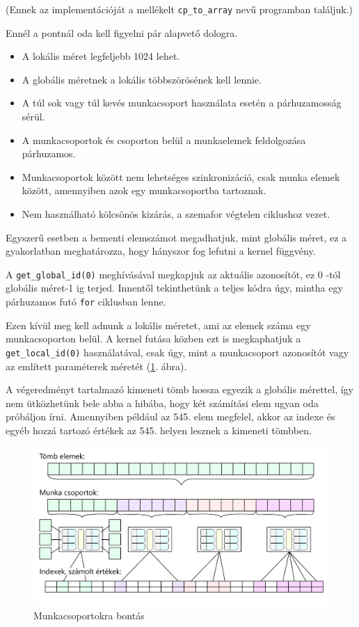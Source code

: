\noindent (Ennek az implementációját a mellékelt \texttt{cp\_to\_array} nevű programban találjuk.)

Ennél a pontnál oda kell figyelni pár alapvető dologra.
\begin{itemize}
\item A lokális méret legfeljebb 1024 lehet.
\item A globális méretnek a lokális többszörösének kell lennie.
\item A túl sok vagy túl kevés munkacsoport használata esetén a párhuzamosság sérül.
\item A munkacsoportok és csoporton belül a munkaelemek feldolgozása párhuzamos.
\item Munkacsoportok között nem lehetséges szinkronizáció, csak munka elemek között, amennyiben azok egy munkacsoportba tartoznak.
\item Nem használható kölcsönös kizárás, a szemafor végtelen ciklushoz vezet.
\end{itemize}


Egyszerű esetben a bementi elemszámot megadhatjuk, mint globális méret, ez a gyakorlatban meghatározza, hogy hányszor fog lefutni a kernel függvény.

A \texttt{get\_global\_id(0)} meghívásával megkapjuk az aktuális azonosítót, ez 0 -tól globális méret-1 ig terjed. Innentől tekinthetünk a teljes kódra úgy, mintha egy párhuzamos futó \texttt{for} ciklusban lenne.

Ezen kívül meg kell adnunk a lokális méretet, ami az elemek száma egy munkacsoporton belül. A kernel futása közben ezt is megkaphatjuk a \texttt{get\_local\_id(0)} használatával, csak úgy, mint a munkacsoport azonosítót vagy az említett paraméterek méretét (\ref{fig:workgroups_black}. ábra).

A végeredményt tartalmazó kimeneti tömb hossza egyezik a globális mérettel, így nem ütközhetünk bele abba a hibába, hogy két számítási elem ugyan oda próbáljon írni. Amennyiben például az 545. elem megfelel, akkor az indexe és egyéb hozzá tartozó értékek az 545. helyen lesznek a kimeneti tömbben.

\begin{figure}[h!]
\centering
\includegraphics[width=\textwidth]{images/workgroups_black.png}
\caption{Munkacsoportokra bontás}
\label{fig:workgroups_black}
\end{figure}

